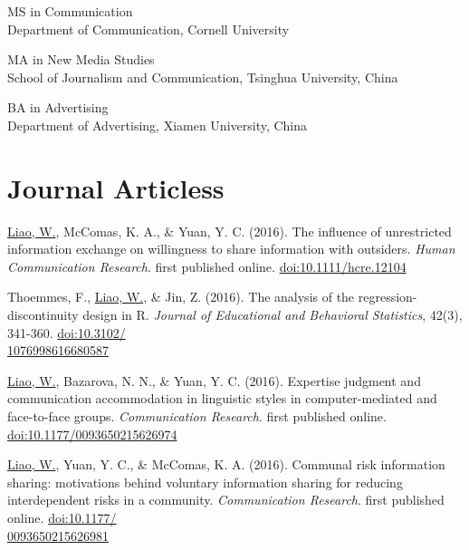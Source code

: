 \documentclass[11pt, letterpaper]{article} %
\newcommand{\years}[1]{\leavevmode\marginnote{\scriptsize #1}} %
\begin{document}
MS in Communication \years{2015} \\
    \textsf{Department of Communication, Cornell University}

MA in New Media Studies \years{2012} \\
    \textsf{School of Journalism and Communication, Tsinghua University, China}

BA in Advertising \years{2009} \\
    \textsf{Department of Advertising, Xiamen University, China}



\section*{Journal Articless}


\begin{hangparas}{.25in}{1}
\underline{Liao, W.}, \years{2016}  McComas, K. A., \& Yuan, Y. C. (2016). The influence of unrestricted information exchange on willingness to share information with outsiders. \textsl{Human Communication Research}. first published online. \href{http://doi.org/10.1111/hcre.12104}{doi:10.1111/hcre.12104} 

    Thoemmes, F., \underline{Liao, W.}, \& Jin, Z. (2016). The analysis of the regression-discontinuity design in R. \textsl{Journal of Educational and Behavioral Statistics}, 42(3), 341-360. \href{http://doi.org/10.3102/1076998616680587}{doi:10.3102/\\1076998616680587}

    \underline{Liao, W.}, Bazarova, N. N., \& Yuan, Y. C. (2016). Expertise judgment and communication accommodation in linguistic styles in computer-mediated and face-to-face groups. \textsl{Communication Research}. first published online. \href{http://doi.org/10.1177/0093650215626974}{doi:10.1177/0093650215626974}

    \underline{Liao, W.}, Yuan, Y. C., \& McComas, K. A. (2016). Communal risk information sharing: motivations behind voluntary information sharing for reducing interdependent risks in a community. \textsl{Communication Research}. first published online. \href{http://doi.org/10.1177/0093650215626981}{doi:10.1177/\\0093650215626981}

\end{hangparas}
\end{document}
